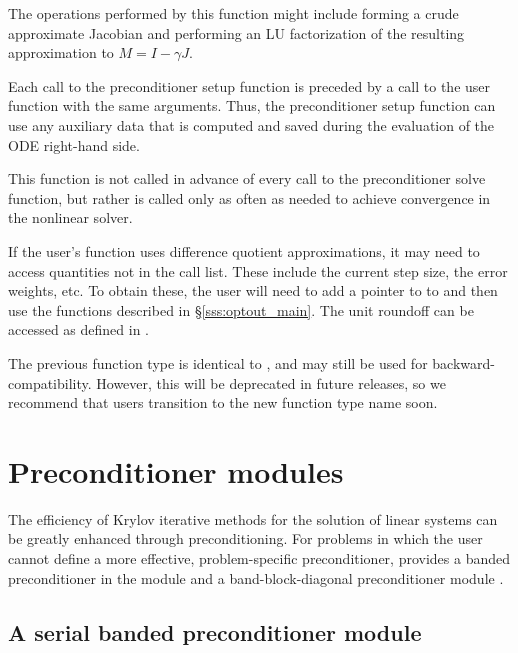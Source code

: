 {
  The operations performed by this function might include forming a crude
  approximate Jacobian and performing an LU factorization of the resulting
  approximation to $M=I - \gamma J$.

  Each call to the preconditioner setup function is preceded by a call to
  the  user function with the same  arguments.
  Thus, the preconditioner setup function can use any auxiliary data that is
  computed and saved during the evaluation of the ODE right-hand side.

  This function is not called in advance of every call to the preconditioner
  solve function, but rather is called only as often as needed to achieve
  convergence in the nonlinear solver.

  If the user's  function uses difference quotient
  approximations, it may need to access quantities not in the call
  list. These include the current step size, the error weights, etc.
  To obtain these, the user will need to add a pointer to 
  to  and then use the  functions described in
  \S\ref{sss:optout_main}. The unit roundoff can be accessed as
   defined in .

  The previous function type  is identical to
  , and may still be used for backward-compatibility.
  However, this will be deprecated in future releases, so we recommend
  that users transition to the new function type name soon.
}


\section{Preconditioner modules}\label{ss:preconds}

The efficiency of Krylov iterative methods for the solution of linear systems
can be greatly enhanced through preconditioning. For problems in which the
user cannot define a more effective, problem-specific preconditioner,
{\cvode} provides a banded preconditioner in the module {\cvbandpre} and
a band-block-diagonal preconditioner module {\cvbbdpre}.

\subsection{A serial banded preconditioner module}\label{sss:cvbandpre}


